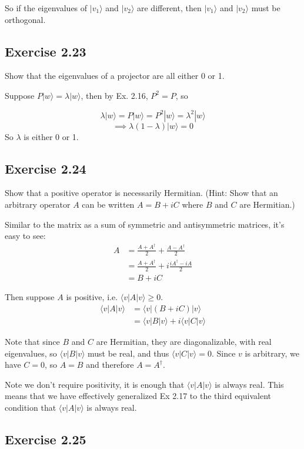 \documentclass[]{article}
\newcommand{\bra}[1]{\langle #1 |}
\newcommand{\ket}[1]{| #1 \rangle}
\begin{document}
So if the eigenvalues of $\ket{v_1}$ and $\ket{v_2}$ are different, then $\ket{v_1}$ and $\ket{v_2}$ must be orthogonal.

\subsection{Exercise 2.23}

Show that the eigenvalues of a projector are all either 0 or 1.

Suppose $P\ket{w} = \lambda\ket{w}$, then by Ex. 2.16, $P^2=P$, so

\[\lambda\ket{w}=P\ket{w}=P^2\ket{w}=\lambda^2\ket{w}\]
\[\implies \lambda(1-\lambda)\ket{w}=0\]
So $\lambda$ is either 0 or 1.

\subsection{Exercise 2.24}
Show that a positive operator is necessarily Hermitian. (Hint: Show that an arbitrary operator $A$ can be written $A=B+iC$ where $B$ and $C$ are Hermitian.)

Similar to the matrix as a sum of symmetric and antisymmetric matrices, it's easy to see:
\begin{align*}
A &= \frac{A+A^\dagger}{2} + \frac{A-A^\dagger}{2} \\
&= \frac{A+A^\dagger}{2} + i\frac{iA^\dagger-iA}{2} \\
&= B + iC
\end{align*}

Then suppose $A$ is positive, i.e. $\bra{v}A\ket{v} \geq 0$.
\begin{align*}
\bra{v}A\ket{v}
&= \bra{v}(B + iC)\ket{v} \\
&= \bra{v}B\ket{v} + i\bra{v}C\ket{v}
\end{align*}

Note that since $B$ and $C$ are Hermitian, they are diagonalizable, with real eigenvalues, so $\bra{v}B\ket{v}$ must be real, and thus $\bra{v}C\ket{v} = 0$. Since $v$ is arbitrary, we have $C = 0$, so $A = B$ and therefore $A = A^\dagger$.

Note we don't require positivity, it is enough that $\bra{v}A\ket{v}$ is always real. This means that we have effectively generalized Ex 2.17 to the third equivalent condition that $\bra{v}A\ket{v}$ is always real.

\subsection{Exercise 2.25}
\end{document}
